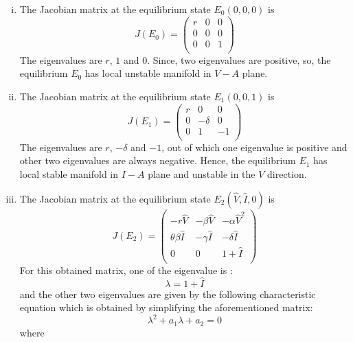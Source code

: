\documentclass[12pt]{article}
\numberwithin{equation}{section}
\begin{document}
\begin{enumerate}[i).]
\item The Jacobian matrix at the equilibrium state $E_0(0,0,0)$ is
\begin{equation}\label{sec3:e29}
J(E_0)=
\left({\begin{matrix}
	r & 0 & 0\\
	0 & 0 & 0\\
	0 & 0 & 1\\
\end{matrix}}\right)
\end{equation}
The eigenvalues are $r$, $1$ and $0$. Since, two eigenvalues are positive, so, the equilibrium $E_0$ has local unstable manifold in $V-A$ plane.
\item The Jacobian matrix at the equilibrium state $E_1(0,0,1)$ is
\begin{equation}\label{sec3:e30}
J(E_1)=
\left({\begin{matrix}
	r & 0 & 0\\
	0 & -\delta & 0\\
	0 & 1 & -1\\
\end{matrix}}\right)
\end{equation}
The eigenvalues are $r$, $-\delta$ and $-1$, out of which one eigenvalue is positive and other two eigenvalues are always negative. Hence, the equilibrium $E_1$ has local stable manifold in $I-A$ plane and unstable in the $V$ direction.
\item The Jacobian matrix at the equilibrium state $E_2(\hat V, \hat I, 0)$ is
\begin{equation}\label{sec3:e31}
J(E_2)=
\left({\begin{matrix}
	-r\hat V & -\beta \hat V & -\alpha \hat V^2\\
	\theta \beta \hat I & -\gamma \hat I & -\delta \hat I\\
	0 & 0 & 1+\hat I\\
\end{matrix}}\right)
\end{equation}
For this obtained matrix, one of the eigenvalue is :
\begin{equation}
\lambda = 1+\hat I
\end{equation}
and the other two eigenvalues are given by the following characteristic equation which is obtained by simplifying the aforementioned matrix:
\begin{equation}
\lambda^2 + a_1\lambda + a_2 = 0
\end{equation}
where

\end{enumerate}
\end{document}
